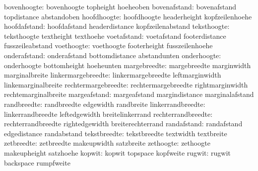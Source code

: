                   bovenhoogte:  bovenhoogte                  topheight
                                hoeheoben
                 bovenafstand:  bovenafstand                 topdistance
                                abstandoben
                  hoofdhoogte:  hoofdhoogte                  headerheight
                                kopfzeilenhoehe
                 hoofdafstand:  hoofdafstand                 headerdistance
                                kopfzeilenabstand
                  teksthoogte:  teksthoogte                  textheight
                                texthoehe
                  voetafstand:  voetafstand                  footerdistance
                                fusszeileabstand
                   voethoogte:  voethoogte                   footerheight
                                fusszeilenhoehe
                 onderafstand:  onderafstand                 bottomdistance
                                abstandunten
                  onderhoogte:  onderhoogte                  bottomheight
                                hoeheunten
                 margebreedte:  margebreedte                 marginwidth
                                marginalbreite
           linkermargebreedte:  linkermargebreedte           leftmarginwidth
                                linkemarginalbreite
          rechtermargebreedte:  rechtermargebreedte          rightmarginwidth
                                rechtemarginalbreite
                 margeafstand:  margeafstand                 margindistance
                                marginalafstand
                  randbreedte:  randbreedte                  edgewidth
                                randbreite
            linkerrandbreedte:  linkerrandbreedte            leftedgewidth
                                breitelinkerrand
           rechterrandbreedte:  rechterrandbreedte           rightedgewidth
                                breiterechterrand
                  randafstand:  randafstand                  edgedistance
                                randabstand
                 tekstbreedte:  tekstbreedte                 textwidth
                                textbreite
                   zetbreedte:  zetbreedte                   makeupwidth
                                satzbreite
                    zethoogte:  zethoogte                    makeupheight
                                satzhoehe
                       kopwit:  kopwit                       topspace
                                kopfweite
                       rugwit:  rugwit                       backspace
                                rumpfweite

